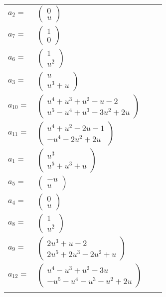 \documentclass[1p]{elsarticle_modified}
\theoremstyle{definition}
\begin{document}
\begin{tabular}{m{7pt} m{180pt} m{7pt} m{180pt} }
\flushright $a_{2}=$&$\begin{pmatrix}0\\u\end{pmatrix}$ \\
\flushright $a_{7}=$&$\begin{pmatrix}1\\0\end{pmatrix}$ \\
\flushright $a_{6}=$&$\begin{pmatrix}1\\u^2\end{pmatrix}$ \\
\flushright $a_{3}=$&$\begin{pmatrix}u\\u^3+u\end{pmatrix}$ \\
\flushright $a_{10}=$&$\begin{pmatrix}u^4+u^3+u^2- u-2\\u^5- u^4+u^3-3 u^2+2 u\end{pmatrix}$ \\
\flushright $a_{11}=$&$\begin{pmatrix}u^4+u^2-2 u-1\\- u^4-2 u^2+2 u\end{pmatrix}$ \\
\flushright $a_{1}=$&$\begin{pmatrix}u^3\\u^5+u^3+u\end{pmatrix}$ \\
\flushright $a_{5}=$&$\begin{pmatrix}- u\\u\end{pmatrix}$ \\
\flushright $a_{4}=$&$\begin{pmatrix}0\\u\end{pmatrix}$ \\
\flushright $a_{8}=$&$\begin{pmatrix}1\\u^2\end{pmatrix}$ \\
\flushright $a_{9}=$&$\begin{pmatrix}2 u^3+u-2\\2 u^5+2 u^3-2 u^2+u\end{pmatrix}$ \\
\flushright $a_{12}=$&$\begin{pmatrix}u^4- u^3+u^2-3 u\\- u^5- u^4- u^3- u^2+2 u\end{pmatrix}$\\&\end{tabular}
\end{document}
